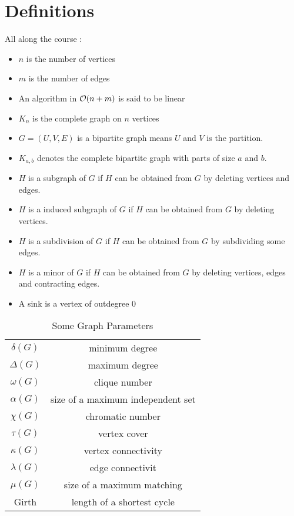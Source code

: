 \documentclass[12pt]{cours}
\begin{document}
\section{Definitions}
All along the course :
\begin{definition}
    \begin{itemize}
        \item $n$ is the number of vertices
        \item $m$ is the number of edges
        \item An algorithm in $\mathcal{O}(n + m)$ is said to be linear
        \item $K_{n}$ is the complete graph on $n$ vertices
        \item $G = \left(U, V, E\right)$ is a bipartite graph means $U$ and $V$ is the partition.
        \item $K_{a, b}$ denotes the complete bipartite graph with parts of size $a$ and $b$.
        \item $H$ is a subgraph of $G$ if $H$ can be obtained from $G$ by deleting vertices and edges.
        \item $H$ is a induced subgraph of $G$ if $H$ can be obtained from $G$ by deleting vertices.
        \item $H$ is a subdivision of $G$ if $H$ can be obtained  from $G$ by subdividing some edges.
        \item $H$ is a minor of $G$ if $H$ can be obtained from $G$ by deleting vertices, edges and contracting edges.
        \item A sink is a vertex of outdegree 0
    \end{itemize}
\end{definition}
\begin{table*}
    \caption{Some Graph Parameters}
    \begin{tabular}{cc}
        $\delta(G)$  & minimum degree                    \\
        $\Delta(G)$  & maximum degree                    \\
        $\omega(G)$  & clique number                     \\
        $\alpha(G)$  & size of a maximum independent set \\
        $\chi(G)$    & chromatic number                  \\
        $\tau(G)$    & vertex cover                      \\
        $\kappa(G)$  & vertex connectivity               \\
        $\lambda(G)$ & edge connectivit                  \\
        $\mu(G)$     & size of a maximum matching        \\
        Girth        & length of a shortest cycle        \\
    \end{tabular}
\end{table*}
\end{document}
